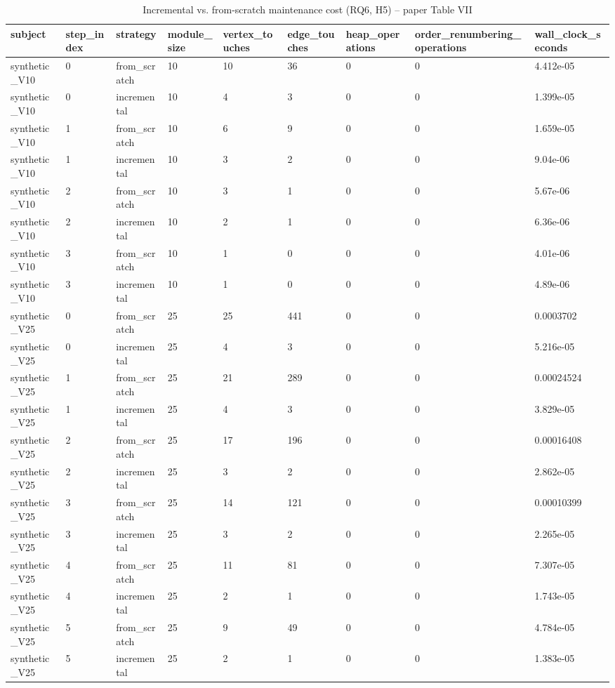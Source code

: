 \begin{table}[t]
\centering
\caption{Incremental vs. from-scratch maintenance cost (RQ6, H5) -- paper Table VII}
\label{tab:efficiency}
\begin{tabular}{lllllllll}
\toprule
subject & step\_index & strategy & module\_size & vertex\_touches & edge\_touches & heap\_operations & order\_renumbering\_operations & wall\_clock\_seconds \\
\midrule
synthetic\_V10 & 0 & from\_scratch & 10 & 10 & 36 & 0 & 0 & 4.412e-05 \\
synthetic\_V10 & 0 & incremental & 10 & 4 & 3 & 0 & 0 & 1.399e-05 \\
synthetic\_V10 & 1 & from\_scratch & 10 & 6 & 9 & 0 & 0 & 1.659e-05 \\
synthetic\_V10 & 1 & incremental & 10 & 3 & 2 & 0 & 0 & 9.04e-06 \\
synthetic\_V10 & 2 & from\_scratch & 10 & 3 & 1 & 0 & 0 & 5.67e-06 \\
synthetic\_V10 & 2 & incremental & 10 & 2 & 1 & 0 & 0 & 6.36e-06 \\
synthetic\_V10 & 3 & from\_scratch & 10 & 1 & 0 & 0 & 0 & 4.01e-06 \\
synthetic\_V10 & 3 & incremental & 10 & 1 & 0 & 0 & 0 & 4.89e-06 \\
synthetic\_V25 & 0 & from\_scratch & 25 & 25 & 441 & 0 & 0 & 0.0003702 \\
synthetic\_V25 & 0 & incremental & 25 & 4 & 3 & 0 & 0 & 5.216e-05 \\
synthetic\_V25 & 1 & from\_scratch & 25 & 21 & 289 & 0 & 0 & 0.00024524 \\
synthetic\_V25 & 1 & incremental & 25 & 4 & 3 & 0 & 0 & 3.829e-05 \\
synthetic\_V25 & 2 & from\_scratch & 25 & 17 & 196 & 0 & 0 & 0.00016408 \\
synthetic\_V25 & 2 & incremental & 25 & 3 & 2 & 0 & 0 & 2.862e-05 \\
synthetic\_V25 & 3 & from\_scratch & 25 & 14 & 121 & 0 & 0 & 0.00010399 \\
synthetic\_V25 & 3 & incremental & 25 & 3 & 2 & 0 & 0 & 2.265e-05 \\
synthetic\_V25 & 4 & from\_scratch & 25 & 11 & 81 & 0 & 0 & 7.307e-05 \\
synthetic\_V25 & 4 & incremental & 25 & 2 & 1 & 0 & 0 & 1.743e-05 \\
synthetic\_V25 & 5 & from\_scratch & 25 & 9 & 49 & 0 & 0 & 4.784e-05 \\
synthetic\_V25 & 5 & incremental & 25 & 2 & 1 & 0 & 0 & 1.383e-05 \\

\end{tabular}
\end{table}
